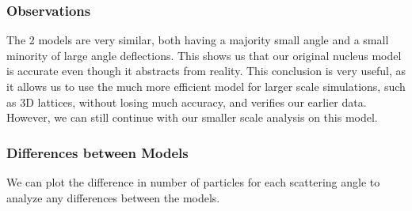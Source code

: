 \documentclass[11pt]{article}
\begin{document}
    \hypertarget{observations}{%
\subsubsection*{Observations}\label{observations}}

The 2 models are very similar, both having a majority small angle and a
small minority of large angle deflections. This shows us that our
original nucleus model is accurate even though it abstracts from
reality. This conclusion is very useful, as it allows us to use the much
more efficient model for larger scale simulations, such as 3D lattices,
without losing much accuracy, and verifies our earlier data. However, we
can still continue with our smaller scale analysis on this model.

    \hypertarget{differences-between-models}{%
\subsubsection{Differences between
Models}\label{differences-between-models}}

We can plot the difference in number of particles for each scattering
angle to analyze any differences between the models.
\end{document}
